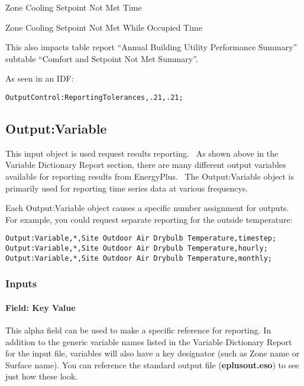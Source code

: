 Zone Cooling Setpoint Not Met Time

Zone Cooling Setpoint Not Met While Occupied Time

This also impacts table report ``Annual Building Utility Performance Summary'' subtable ``Comfort and Setpoint Not Met Summary''.

As seen in an IDF:

\begin{lstlisting}
OutputControl:ReportingTolerances,.21,.21;
\end{lstlisting}

\subsection{Output:Variable}\label{outputvariable}

This input object is used request results reporting.~ As shown above in the Variable Dictionary Report section, there are many different output variables available for reporting results from EnergyPlus.~ The Output:Variable object is primarily used for reporting time series data at various frequencys.

Each Output:Variable object causes a specific number assignment for outputs. For example, you could request separate reporting for the outside temperature:

\begin{lstlisting}
Output:Variable,*,Site Outdoor Air Drybulb Temperature,timestep;
Output:Variable,*,Site Outdoor Air Drybulb Temperature,hourly;
Output:Variable,*,Site Outdoor Air Drybulb Temperature,monthly;
\end{lstlisting}

\subsubsection{Inputs}\label{inputs-8-019}

\paragraph{Field: Key Value}\label{field-key-value}

This alpha field can be used to make a specific reference for reporting. In addition to the generic variable names listed in the Variable Dictionary Report for the input file, variables will also have a key designator (such as Zone name or Surface name). You can reference the standard output file (\textbf{eplusout.eso}) to see just how these look.

